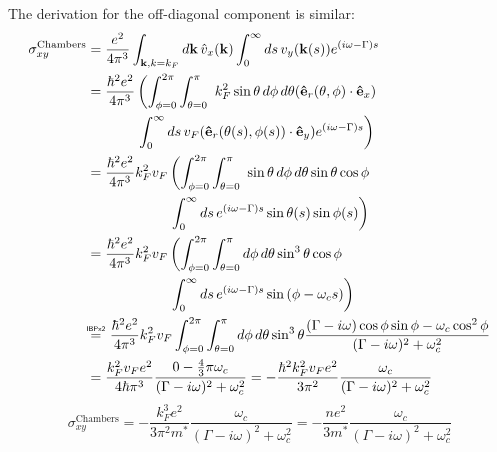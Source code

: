 The derivation for the off-diagonal component is similar:
\begin{align}
	\sigma_{xy}^{\text{Chambers}} &= \frac{e^2}{4\pi^3}\displaystyle\int_{\vb{k}, k = k_F}^{}\mathop{d\vb{k}} \hat{v}_x(\vb{k}) 
		\int_0^{\infty}\mathop{ds} v_y(\vb{k}(s)) e^{(i\omega - \Gamma)s} \\
	&= \begin{aligned}[t] \frac{\hbar^2 e^2}{4\pi^3}&\left(\displaystyle\int_{\phi = 0}^{2\pi}\int_{\theta = 0}^{\pi}\ k_F^2\sin{\theta}\mathop{d\phi}\mathop{d\theta}(\vu{e}_r(\theta, \phi)\cdot \vu{e}_x)\right. \\
		&\left.\int_0^{\infty}\mathop{ds} v_F (\vu{e}_r(\theta(s), \phi(s))\cdot \vu{e}_y) e^{(i\omega - \Gamma)s}\right) \end{aligned} \\
	&= \begin{aligned}[t] \frac{\hbar^2 e^2}{4\pi^3}k_F^2v_F&\left(\displaystyle\int_{\phi = 0}^{2\pi}\int_{\theta = 0}^{\pi}\ \sin{\theta}\mathop{d\phi}\mathop{d\theta} \sin{\theta}\cos{\phi} \right. \\
		&\left.\int_0^{\infty}\mathop{ds} e^{(i\omega - \Gamma)s} \sin{\theta(s)}\sin{\phi(s)}\right) \end{aligned} \\
	&= \begin{aligned}[t] \frac{\hbar^2 e^2}{4\pi^3}k_F^2v_F&\left(\displaystyle\int_{\phi = 0}^{2\pi}\int_{\theta = 0}^{\pi} \mathop{d\phi}\mathop{d\theta} \sin^3{\theta}\cos{\phi} \right. \\
		&\left.\int_0^{\infty}\mathop{ds} e^{(i\omega - \Gamma)s} \sin{(\phi - \omega_c s)}\right) \end{aligned} \\
	&\myeq\ \frac{\hbar^2 e^2}{4\pi^3}k_F^2v_F\displaystyle\int_{\phi = 0}^{2\pi}\int_{\theta = 0}^{\pi} \mathop{d\phi}\mathop{d\theta} \sin^3{\theta}\frac{(\Gamma - i\omega)\cos{\phi}\sin\phi-\omega_c\cos^2\phi}{(\Gamma - i\omega)^2 + \omega_c^2} \\
	&= \frac{k_F^2v_Fe^2}{4\hbar\pi^3}\frac{0 - \frac{4}{3}\pi\omega_c}{(\Gamma - i\omega)^2 + \omega_c^2} = -\frac{\hbar^2 k_F^2v_Fe^2}{3\pi^2}\frac{\omega_c}{(\Gamma - i\omega)^2 + \omega_c^2}
\end{align}
\begin{equation}
	\sigma_{xy}^{\text{Chambers}} = -\frac{k_F^3e^2}{3\pi^2m^*}\frac{\omega_c}{(\Gamma - i\omega)^2 + \omega_c^2}
    = -\frac{n e^2}{3m^*}\frac{\omega_c}{(\Gamma - i\omega)^2 + \omega_c^2}
\end{equation}

